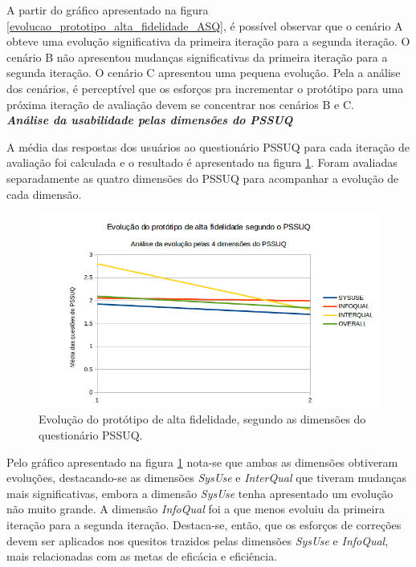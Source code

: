 	A partir do gráfico apresentado na figura \ref{evolucao_prototipo_alta_fidelidade_ASQ}, é possível observar que o 
	cenário A obteve uma evolução significativa da primeira iteração para a segunda iteração.
	O cenário B não apresentou mudanças significativas da primeira iteração para a segunda iteração. O cenário C apresentou 
	uma pequena evolução. Pela a análise dos cenários, é perceptível que os esforços pra incrementar o protótipo para uma 
	próxima iteração de avaliação devem se concentrar nos cenários B e C.\\
	
	\noindent
	\emph{\textbf{Análise da usabilidade pelas dimensões do PSSUQ}}
	
	A média das respostas dos usuários ao questionário PSSUQ para cada iteração de avaliação foi calculada e
	o resultado é apresentado na figura \ref{evolucao_prototipo_PSSUQ}.
	Foram avaliadas separadamente as quatro dimensões do PSSUQ para acompanhar a evolução de cada dimensão.
	
	\begin{figure}[!htpb]
	  \centering
	  \includegraphics[scale=0.8]{editaveis/figuras/evolucao_prototipo_PSSUQ}
	  \caption[Evolução do protótipo de alta fidelidade, segundo as dimensões do questionário PSSUQ]
	    {Evolução do protótipo de alta fidelidade, segundo as dimensões do questionário PSSUQ.}
	  \label{evolucao_prototipo_PSSUQ}
	\end{figure}
	
	Pelo gráfico apresentado na figura \ref{evolucao_prototipo_PSSUQ} nota-se que ambas as dimensões obtiveram 
	evoluções, destacando-se as dimensões \textit{SysUse} e \textit{InterQual} que tiveram mudanças mais significativas, embora
	a dimensão \textit{SysUse} tenha apresentado um evolução não muito grande.
	A dimensão \textit{InfoQual} foi a que menos evoluiu da primeira iteração para a segunda iteração. Destaca-se, então,
	que os esforços de correções devem ser aplicados nos quesitos trazidos pelas dimensões \textit{SysUse} e \textit{InfoQual},
	mais relacionadas com as metas de eficácia e eficiência.
	

